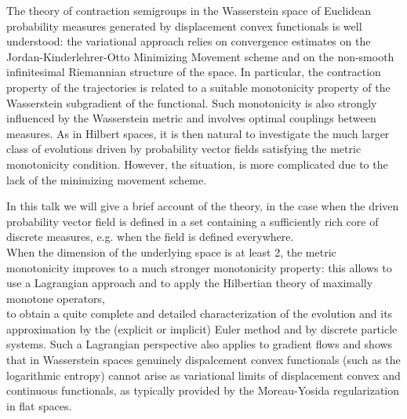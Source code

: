 \mypage
{}
\begin{myabstract}
The theory of contraction semigroups in the Wasserstein space of Euclidean probability measures generated by displacement convex functionals is well understood: the variational approach relies on convergence estimates on the Jordan-Kinderlehrer-Otto
Minimizing Movement scheme and on the non-smooth infinitesimal Riemannian structure of the space. In particular, the contraction property of the trajectories is related to a suitable monotonicity property of the Wasserstein subgradient of the functional. Such monotonicity is also strongly influenced by the Wasserstein metric and involves optimal couplings between measures.
As in Hilbert spaces, it is then natural to investigate the much larger class of evolutions driven by probability vector fields satisfying the metric monotonicity condition. However, the situation, is more complicated due to the lack of the minimizing movement scheme.

In this talk we will give a brief account of the theory, in the case when the driven probability vector field is defined in a set containing a sufficiently rich core of discrete measures, e.g. when the field is defined everywhere.\\\relax
When the dimension of the underlying space is at least 2, the metric monotonicity improves to a much stronger monotonicity property: this allows to use a Lagrangian approach and to apply the Hilbertian theory of maximally monotone operators,\\\relax
to obtain a quite complete and detailed characterization of the evolution and its approximation by the (explicit or implicit) Euler method and by discrete particle systems. Such a Lagrangian perspective also applies to gradient flows and shows that in Wasserstein spaces genuinely dispalcement convex functionals (such as the logarithmic entropy) cannot arise as variational limits of displacement convex and continuous functionals, as typically provided by the Moreau-Yosida regularization in flat spaces.
\end{myabstract}

